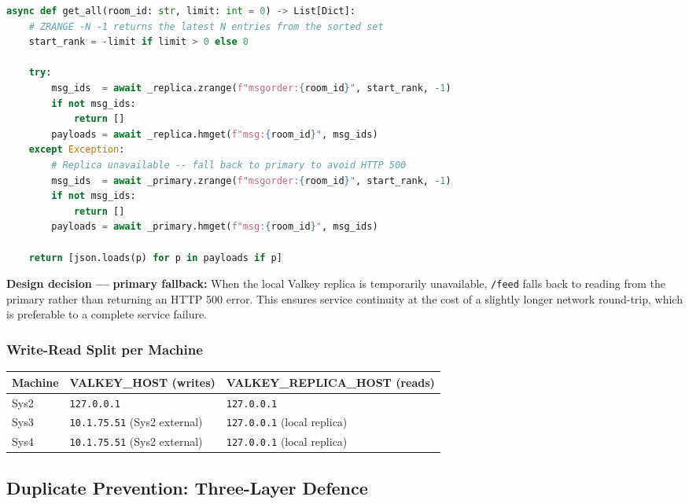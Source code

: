 \documentclass[12pt,a4paper]{article}
\begin{document}
\begin{lstlisting}[language=Python, caption={Paginated fetch with primary fallback in feed\_store.py}]
async def get_all(room_id: str, limit: int = 0) -> List[Dict]:
    # ZRANGE -N -1 returns the latest N entries from the sorted set
    start_rank = -limit if limit > 0 else 0

    try:
        msg_ids  = await _replica.zrange(f"msgorder:{room_id}", start_rank, -1)
        if not msg_ids:
            return []
        payloads = await _replica.hmget(f"msg:{room_id}", msg_ids)
    except Exception:
        # Replica unavailable -- fall back to primary to avoid HTTP 500
        msg_ids  = await _primary.zrange(f"msgorder:{room_id}", start_rank, -1)
        if not msg_ids:
            return []
        payloads = await _primary.hmget(f"msg:{room_id}", msg_ids)

    return [json.loads(p) for p in payloads if p]
\end{lstlisting}

\begin{notebox}
\textbf{Design decision --- primary fallback:} When the local Valkey replica is temporarily unavailable, \texttt{/feed} falls back to reading from the primary rather than returning an HTTP 500 error. This ensures service continuity at the cost of a slightly longer network round-trip, which is preferable to a complete service failure.
\end{notebox}

\subsubsection{Write-Read Split per Machine}

\begin{center}
\begin{tabular}{lll}
\toprule
\textbf{Machine} & \textbf{VALKEY\_HOST (writes)} & \textbf{VALKEY\_REPLICA\_HOST (reads)} \\
\midrule
Sys2 & \texttt{127.0.0.1} & \texttt{127.0.0.1} \\
Sys3 & \texttt{10.1.75.51} (Sys2 external) & \texttt{127.0.0.1} (local replica) \\
Sys4 & \texttt{10.1.75.51} (Sys2 external) & \texttt{127.0.0.1} (local replica) \\
\bottomrule
\end{tabular}
\end{center}

\subsection{Duplicate Prevention: Three-Layer Defence}
\end{document}
